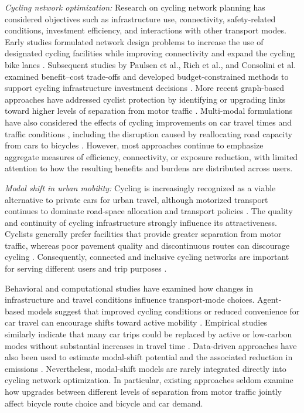 \documentclass[lettersize,journal]{IEEEtran}
\begin{document}
\textit{Cycling network optimization:}
Research on cycling network planning has considered objectives such as infrastructure use, connectivity, safety-related conditions, investment efficiency, and interactions with other transport modes. Early studies formulated network design problems to increase the use of designated cycling facilities while improving connectivity and expand the cycling bike lanes \cite{mesbah2012bilevel,smith2012mathematical,duthie2014optimization}. Subsequent studies by Paulsen et al., Rich et al., and Consolini et al. examined benefit--cost trade-offs and developed budget-constrained methods to support cycling infrastructure investment decisions \cite{paulsen2023societally,shui2019optimization,folco2023data,ardizzoni2024identification}. More recent graph-based approaches have addressed cyclist protection by identifying or upgrading links toward higher levels of separation from motor traffic \cite{2024graphbased}. Multi-modal formulations have also considered the effects of cycling improvements on car travel times and traffic conditions \cite{mesbah2012bilevel,smith2012mathematical,wiedemann2025bike}, including the disruption caused by reallocating road capacity from cars to bicycles \cite{mahfouz2023road}. However, most approaches continue to emphasize aggregate measures of efficiency, connectivity, or exposure reduction, with limited attention to how the resulting benefits and burdens are distributed across users.

\textit{Modal shift in urban mobility:}
Cycling is increasingly recognized as a viable alternative to private cars for urban travel, although motorized transport continues to dominate road-space allocation and transport policies \cite{cox2020theorising}. The quality and continuity of cycling infrastructure strongly influence its attractiveness. Cyclists generally prefer facilities that provide greater separation from motor traffic, whereas poor pavement quality and discontinuous routes can discourage cycling \cite{buehler2016bikeway}. Consequently, connected and inclusive cycling networks are important for serving different users and trip purposes \cite{cox2020politics}.

Behavioral and computational studies have examined how changes in infrastructure and travel conditions influence transport-mode choices. Agent-based models suggest that improved cycling conditions or reduced convenience for car travel can encourage shifts toward active mobility \cite{adam2024agent}. Empirical studies similarly indicate that many car trips could be replaced by active or low-carbon modes without substantial increases in travel time \cite{monzon2006measure,monzon2011potential}. Data-driven approaches have also been used to estimate modal-shift potential and the associated reduction in emissions \cite{bagheri2020computational,bagheri2020analysis}. Nevertheless, modal-shift models are rarely integrated directly into cycling network optimization. In particular, existing approaches seldom examine how upgrades between different levels of separation from motor traffic jointly affect bicycle route choice and bicycle and car demand.
\end{document}
